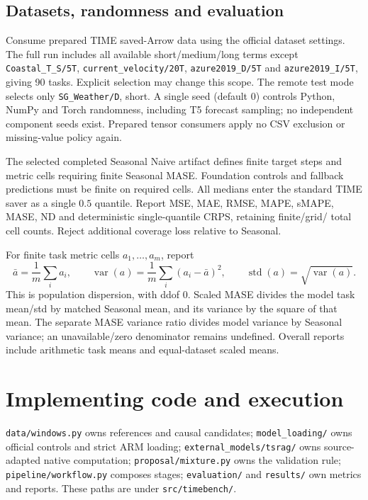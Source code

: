 \documentclass[11pt,a4paper]{article}
\begin{document}
\subsection{Datasets, randomness and evaluation}
Consume prepared TIME saved-Arrow data using the official dataset settings.
The full run includes all available short/medium/long terms except
\texttt{Coastal\_T\_S/5T}, \texttt{current\_velocity/20T},
\texttt{azure2019\_D/5T} and \texttt{azure2019\_I/5T}, giving 90 tasks.
Explicit selection may change this scope. The remote test mode selects only
\texttt{SG\_Weather/D}, short. A single seed (default 0) controls Python,
NumPy and Torch randomness, including T5 forecast sampling; no independent
component seeds exist. Prepared tensor consumers apply no CSV exclusion or
missing-value policy again.

The selected completed Seasonal Naive artifact defines finite target steps
and metric cells requiring finite Seasonal MASE. Foundation controls and
fallback predictions must be finite on required cells. All medians enter the
standard TIME saver as a single $0.5$ quantile. Report MSE, MAE, RMSE, MAPE,
sMAPE, MASE, ND and deterministic single-quantile CRPS, retaining finite/grid/
total cell counts. Reject additional coverage loss relative to Seasonal.

For finite task metric cells $a_1,\ldots,a_m$, report
\[
 \bar a=\frac1m\sum_i a_i,\qquad
 \operatorname{var}(a)=\frac1m\sum_i(a_i-\bar a)^2,\qquad
 \operatorname{std}(a)=\sqrt{\operatorname{var}(a)}.
\]
This is population dispersion, with ddof 0. Scaled MASE divides the model
task mean/std by matched Seasonal mean, and its variance by the square of
that mean. The separate MASE variance ratio divides model variance by
Seasonal variance; an unavailable/zero denominator remains undefined.
Overall reports include arithmetic task means and equal-dataset scaled means.

\section{Implementing code and execution}
\texttt{data/windows.py} owns references and causal candidates;
\texttt{model\_loading/} owns official controls and strict ARM loading;
\texttt{external\_models/tsrag/} owns source-adapted native computation;
\texttt{proposal/mixture.py} owns the validation rule;
\texttt{pipeline/workflow.py} composes stages;
\texttt{evaluation/} and \texttt{results/} own metrics and reports.
These paths are under \texttt{src/timebench/}.
\end{document}
